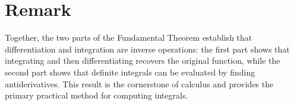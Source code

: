 \documentclass[11pt,a4paper]{article}
\begin{document}
\section{Remark}

Together, the two parts of the Fundamental Theorem establish that differentiation and integration are inverse operations: the first part shows that integrating and then differentiating recovers the original function, while the second part shows that definite integrals can be evaluated by finding antiderivatives. This result is the cornerstone of calculus and provides the primary practical method for computing integrals.
\end{document}
